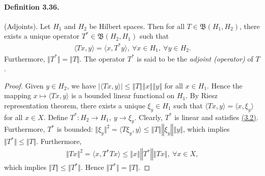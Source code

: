 \documentclass{article}
\begin{document}
\paragraph{Definition 3.36.\label{def:3.36}} (Adjoints). Let $H_1$ and $H_2$ be Hilbert spaces. Then for all $T\in\mathfrak{B}(H_1,H_2)$, there exists a unique operator $T^*\in\mathfrak{B}(H_2,H_1)$ such that
\begin{align*}
	\langle Tx,y\rangle = \langle x,T^*y\rangle,\ \forall x\in H_1,\ \forall y\in H_2.\label{eq:3.2}\tag{3.2}
\end{align*}
Furthermore, $\Vert T^*\Vert = \Vert T\Vert$. The operator $T^*$ is said to be the \textit{adjoint (operator)} of $T$.
\begin{proof}
Given $y\in H_2$, we have $\vert\langle Tx,y\rangle\vert\leq\left\Vert T\right\Vert\left\Vert x\right\Vert\left\Vert y\right\Vert$ for all $x\in H_1$. Hence the mapping $x\mapsto\langle Tx,y\rangle$ is a bounded linear functional on $H_1$. By Riesz representation theorem, there exists a unique $\xi_y\in H_1$ such that $\langle Tx,y\rangle=\langle x,\xi_y\rangle$ for all $x\in X$. Define $T^*:H_2\to H_1,\ y\to\xi_y$. Clearly, $T^*$ is linear and satisfies \hyperref[eq:3.2]{(3.2)}. Furthermore, $T^*$ is bounded: $\Vert\xi_y\Vert^2=\langle T\xi_y,y\rangle\leq\left\Vert T\right\Vert\left\Vert \xi_y\right\Vert\left\Vert y\right\Vert$, which implies $\Vert T^*\Vert\leq\Vert T\Vert$. Furthermore,
\begin{align*}
	\Vert Tx\Vert^2 = \langle x,T^*Tx\rangle \leq \left\Vert x\right\Vert\left\Vert T^*\right\Vert\left\Vert Tx\right\Vert,\ \forall x\in X,
\end{align*}
which implies $\Vert T\Vert\leq\Vert T^*\Vert$. Hence $\Vert T^*\Vert=\Vert T\Vert$.
\end{proof}
\end{document}
